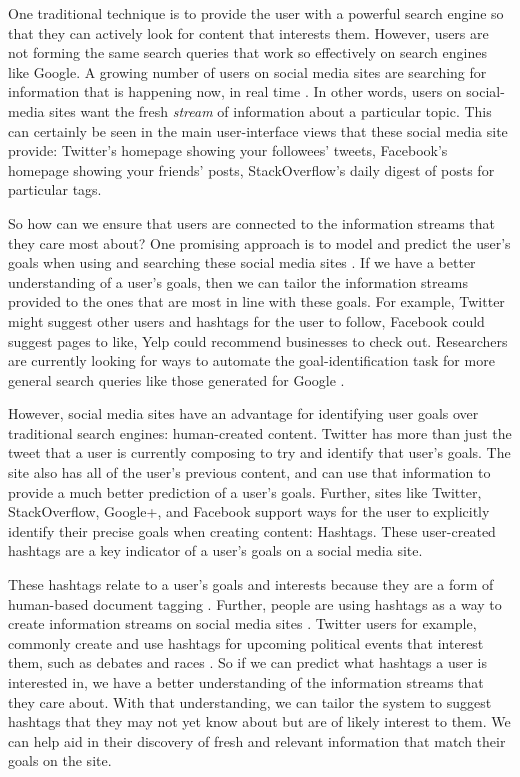 \documentclass[man,floatsintext,donotrepeattitle]{apa6}
\begin{document}
One traditional technique is to provide the user with a powerful search engine so that they can actively look for content that interests them.
However, users are not forming the same search queries that work so effectively on search engines like Google.
A growing number of users on social media sites are searching for information that is happening now, in real time \parencite{Jansen2011}.
In other words, users on social-media sites want the fresh \emph{stream} of information about a particular topic.
This can certainly be seen in the main user-interface views that these social media site provide:
Twitter's homepage showing your followees' tweets, Facebook's homepage showing your friends' posts, StackOverflow's daily digest of posts for particular tags.

So how can we ensure that users are connected to the information streams that they care most about?
One promising approach is to model and predict the user's goals when using and searching these social media sites \parencite{Rose2004}.
If we have a better understanding of a user's goals, then we can tailor the information streams provided to the ones that are most in line with these goals.
For example, Twitter might suggest other users and hashtags for the user to follow, Facebook could suggest pages to like, Yelp could recommend businesses to check out.
Researchers are currently looking for ways to automate the goal-identification task for more general search queries like those generated for Google \parencites{Jansen2008}{Lee2005}.

However, social media sites have an advantage for identifying user goals over traditional search engines: human-created content.
Twitter has more than just the tweet that a user is currently composing to try and identify that user's goals.
The site also has all of the user's previous content, and can use that information to provide a much better prediction of a user's goals.
Further, sites like Twitter, StackOverflow, Google+, and Facebook support ways for the user to explicitly identify their precise goals when creating content: Hashtags.
These user-created hashtags are a key indicator of a user's goals on a social media site. 

These hashtags relate to a user's goals and interests because they are a form of human-based document tagging \parencite{Chang2010}.
Further, people are using hashtags as a way to create information streams on social media sites \parencite{Kwak2010}.
Twitter users for example, commonly create and use hashtags for upcoming political events that interest them, such as debates and races \parencite{Diakopoulos2010}.
So if we can predict what hashtags a user is interested in, we have a better understanding of the information streams that they care about.
With that understanding, we can tailor the system to suggest hashtags that they may not yet know about but are of likely interest to them.
We can help aid in their discovery of fresh and relevant information that match their goals on the site.
\end{document}
